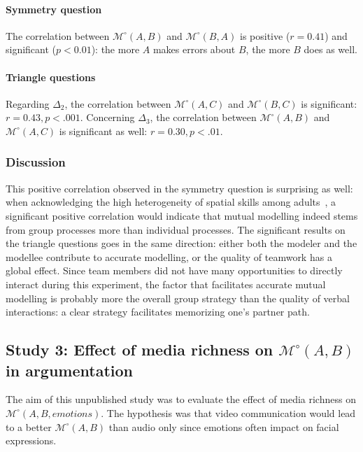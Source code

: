 \documentclass[natbib]{svjour3}
\newcommand{\Model}[3]{{$\mathcal{M}^{\circ}(#1, #2, #3)$}}
\newcommand{\gModel}[2]{{$\mathcal{M}^{\circ}(#1, #2)$}}
\begin{document}
\paragraph{Symmetry question} The correlation between \gModel{A}{B}  and
\gModel{B}{A}  is positive ($r = 0.41$) and significant ($p < 0.01$): the more $A$
makes errors about $B$, the more $B$ does as well.

\paragraph{Triangle questions} Regarding $\Delta_2$, the correlation between
\gModel{A}{C} and \gModel{B}{C} is significant: $r=0.43, p <.001$. Concerning
$\Delta_3$, the correlation between \gModel{A}{B} and \gModel{A}{C} is
significant as well: $r=0.30, p <.01$.

\subsubsection*{Discussion}

This positive correlation observed in the symmetry question is surprising as
well: when acknowledging the high heterogeneity of spatial skills among
adults~\citep{liben1981spatial}, a significant positive correlation would
indicate that mutual modelling indeed stems from group processes more than
individual processes. The significant results on the triangle questions goes in
the same direction: either both the modeler and the modellee contribute to
accurate modelling, or the quality of teamwork has a global effect. Since team
members did not have many opportunities to directly interact during this
experiment, the factor that facilitates accurate mutual modelling is probably
more the overall group strategy than the quality of verbal interactions: a clear
strategy facilitates memorizing one's partner path. 




\subsection{{\bf Study 3}:  Effect of media richness on \gModel{A}{B} in argumentation}

The aim of this unpublished study was to evaluate the effect of media richness
on \Model{A}{B}{emotions}. The hypothesis was that video communication would
lead to a better \gModel{A}{B} than audio only since emotions often impact on
facial expressions.
\end{document}
